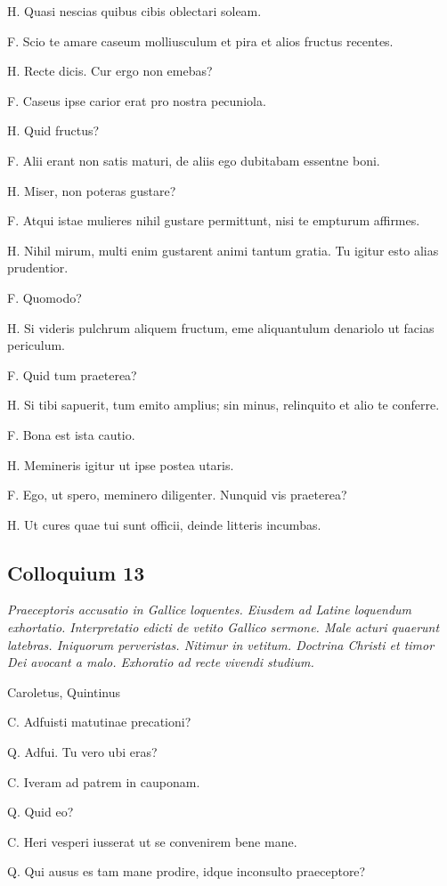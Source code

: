 \documentclass{article}
\begin{document}
H. Quasi nescias quibus cibis oblectari soleam.

F. Scio te amare caseum molliusculum et pira et alios fructus recentes.

H. Recte dicis. Cur ergo non emebas?

F. Caseus ipse carior erat pro nostra pecuniola.

H. Quid fructus?

F. Alii erant non satis maturi, de aliis ego dubitabam essentne boni.

H. Miser, non poteras gustare?

F. Atqui istae mulieres nihil gustare permittunt, nisi te empturum affirmes.

H. Nihil mirum, multi enim gustarent animi tantum gratia. Tu igitur esto alias prudentior.

F. Quomodo?

H. Si videris pulchrum aliquem fructum, eme aliquantulum denariolo ut facias periculum.

F. Quid tum praeterea?

H. Si tibi sapuerit, tum emito amplius; sin minus, relinquito et alio te conferre.

F. Bona est ista cautio.

H. Memineris igitur ut ipse postea utaris.

F. Ego, ut spero, meminero diligenter. Nunquid vis praeterea?

H. Ut cures quae tui sunt officii, deinde litteris incumbas.

\subsection{Colloquium 13}
\emph{Praeceptoris accusatio in Gallice loquentes. Eiusdem ad Latine loquendum exhortatio. Interpretatio edicti de vetito Gallico sermone. Male acturi quaerunt latebras. Iniquorum perveristas. Nitimur in vetitum. Doctrina Christi et timor Dei avocant a malo. Exhoratio ad recte vivendi studium.}

Caroletus, Quintinus

C. Adfuisti matutinae precationi?

Q. Adfui. Tu vero ubi eras?

C. Iveram ad patrem in cauponam.

Q. Quid eo?

C. Heri vesperi iusserat ut se convenirem bene mane.

Q. Qui ausus es tam mane prodire, idque inconsulto praeceptore?
\end{document}
